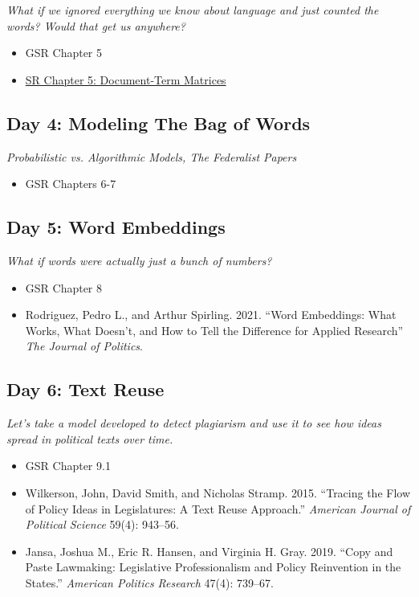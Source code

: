\documentclass[11pt, letterpaper]{article}
\begin{document}
\textit{What if we ignored everything we know about language and just counted the words? Would that get us anywhere?}

\begin{itemize}
	\item GSR Chapter 5
	\item \href{https://www.tidytextmining.com/dtm.html}{SR Chapter 5: Document-Term Matrices}
\end{itemize}

\subsection*{Day 4: Modeling The Bag of Words}

\textit{Probabilistic vs. Algorithmic Models, The Federalist Papers}

\begin{itemize}
	\item GSR Chapters 6-7
\end{itemize}

\subsection*{Day 5: Word Embeddings}

\textit{What if words were actually just a bunch of numbers?}

\begin{itemize}
	\item GSR Chapter 8
	\item Rodriguez, Pedro L., and Arthur Spirling. 2021. ``Word Embeddings: What Works, What Doesn’t, and How to Tell the Difference for Applied Research'' \textit{The Journal of Politics}.
\end{itemize}


\subsection*{Day 6: Text Reuse}

\textit{Let's take a model developed to detect plagiarism and use it to see how ideas spread in political texts over time.}

\begin{itemize}
	\item GSR Chapter 9.1
	\item Wilkerson, John, David Smith, and Nicholas Stramp. 2015. ``Tracing the Flow of Policy Ideas in Legislatures: A Text Reuse Approach.'' \textit{American Journal of Political Science} 59(4): 943–56.
	\item Jansa, Joshua M., Eric R. Hansen, and Virginia H. Gray. 2019. ``Copy and Paste Lawmaking: Legislative Professionalism and Policy Reinvention in the States.'' \textit{American Politics Research} 47(4): 739–67.
\end{itemize}
\end{document}
